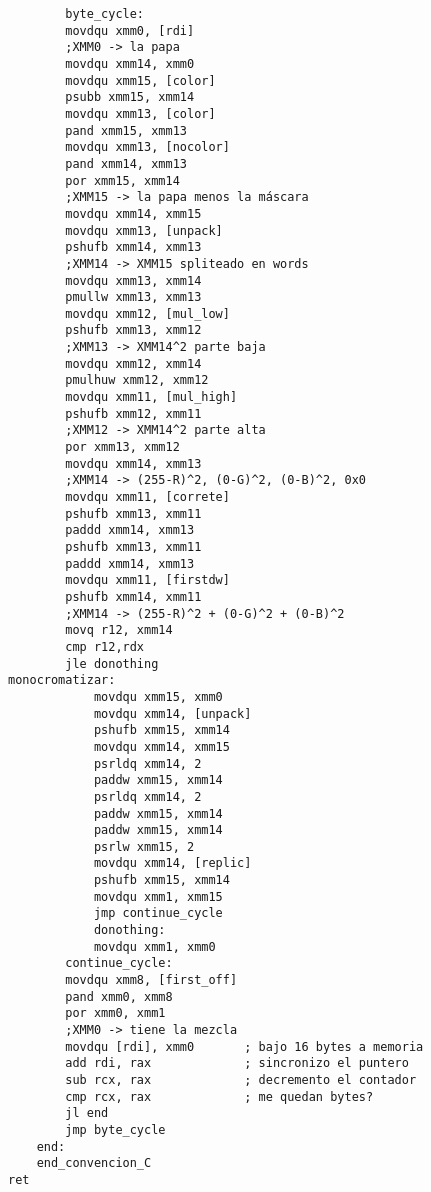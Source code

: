 \begin{verbatim}
        byte_cycle:
        movdqu xmm0, [rdi]
        ;XMM0 -> la papa
        movdqu xmm14, xmm0
        movdqu xmm15, [color]
        psubb xmm15, xmm14
        movdqu xmm13, [color]
        pand xmm15, xmm13
        movdqu xmm13, [nocolor]
        pand xmm14, xmm13
        por xmm15, xmm14
        ;XMM15 -> la papa menos la máscara
        movdqu xmm14, xmm15
        movdqu xmm13, [unpack]
        pshufb xmm14, xmm13
        ;XMM14 -> XMM15 spliteado en words
        movdqu xmm13, xmm14
        pmullw xmm13, xmm13
        movdqu xmm12, [mul_low]
        pshufb xmm13, xmm12
        ;XMM13 -> XMM14^2 parte baja
        movdqu xmm12, xmm14
        pmulhuw xmm12, xmm12
        movdqu xmm11, [mul_high]
        pshufb xmm12, xmm11
        ;XMM12 -> XMM14^2 parte alta
        por xmm13, xmm12
        movdqu xmm14, xmm13
        ;XMM14 -> (255-R)^2, (0-G)^2, (0-B)^2, 0x0
        movdqu xmm11, [correte]
        pshufb xmm13, xmm11
        paddd xmm14, xmm13
        pshufb xmm13, xmm11
        paddd xmm14, xmm13
        movdqu xmm11, [firstdw]
        pshufb xmm14, xmm11
        ;XMM14 -> (255-R)^2 + (0-G)^2 + (0-B)^2
        movq r12, xmm14
        cmp r12,rdx
        jle donothing
monocromatizar:
            movdqu xmm15, xmm0
            movdqu xmm14, [unpack]
            pshufb xmm15, xmm14
            movdqu xmm14, xmm15
            psrldq xmm14, 2
            paddw xmm15, xmm14
            psrldq xmm14, 2
            paddw xmm15, xmm14
            paddw xmm15, xmm14
            psrlw xmm15, 2
            movdqu xmm14, [replic]
            pshufb xmm15, xmm14
            movdqu xmm1, xmm15
            jmp continue_cycle
            donothing:
            movdqu xmm1, xmm0
        continue_cycle:
        movdqu xmm8, [first_off]
        pand xmm0, xmm8
        por xmm0, xmm1
        ;XMM0 -> tiene la mezcla
        movdqu [rdi], xmm0       ; bajo 16 bytes a memoria
        add rdi, rax             ; sincronizo el puntero
        sub rcx, rax             ; decremento el contador
        cmp rcx, rax             ; me quedan bytes?
        jl end
        jmp byte_cycle
    end:
    end_convencion_C
ret

\end{verbatim}
